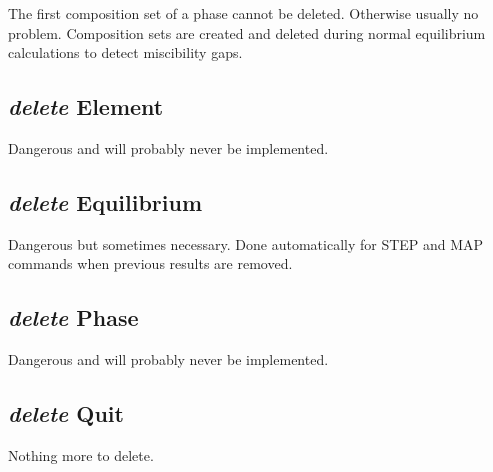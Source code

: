 \documentclass[12pt]{article}
\begin{document}
The first composition set of a phase cannot be deleted.  Otherwise
usually no problem.  Composition sets are created and deleted during
normal equilibrium calculations to detect miscibility gaps.

\subsection{{\em delete} Element}

Dangerous and will probably never be implemented.

\subsection{{\em delete} Equilibrium}

Dangerous but sometimes necessary.  Done automatically for STEP and
MAP commands when previous results are removed.

\subsection{{\em delete} Phase}

Dangerous and will probably never be implemented.

\subsection{{\em delete} Quit}

Nothing more to delete.

\end{document}
